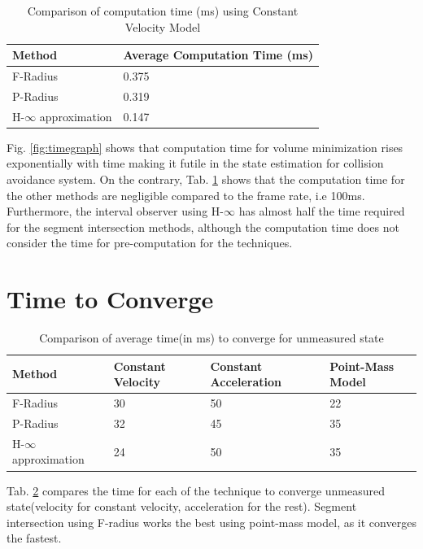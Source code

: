 \begin{table}[htbp]
\caption{Comparison of computation time (ms) using Constant Velocity Model\\}
	\centering
	\renewcommand{\arraystretch}{1.1}
	\small	
	\begin{tabular}{l l}
		\toprule 
		\textbf{Method} & \textbf{Average Computation Time (ms)}\\ \midrule
		F-Radius & 0.375\\
		P-Radius &0.319\\
		H-$\infty$ approximation & 0.147\\
		\bottomrule
	\end{tabular}
	\label{tab:comptime}
\end{table}
Fig. \ref{fig:timegraph} shows that computation time for volume minimization rises exponentially with time making it futile in the state estimation for collision avoidance system. On the contrary, Tab. \ref{tab:comptime} shows that the computation time for the other methods are negligible compared to the frame rate, i.e 100ms. Furthermore, the interval observer using H-$\infty$ has almost half the time required for the segment intersection methods, although the computation time does not consider the time for pre-computation for the techniques.



\section{Time to Converge}
\begin{table}[htbp]
\caption{Comparison of average time(in ms) to converge for unmeasured state\\}
	\centering
	\renewcommand{\arraystretch}{1.1}
	\small	
	\begin{tabular}{l l l l}
		\toprule 
		\textbf{Method} & \textbf{Constant Velocity} & \textbf{Constant Acceleration} & \textbf{Point-Mass Model} \\ \midrule
		F-Radius & 30 & 50 & 22\\
		P-Radius & 32 & 45 & 35\\
		H-$\infty$ approximation & 24 & 50 & 35\\
		\bottomrule
	\end{tabular}
	\label{tab:convtime}
\end{table}
Tab. \ref{tab:convtime} compares the time for each of the technique to converge unmeasured state(velocity for constant velocity, acceleration for the rest). Segment intersection using F-radius works the best using point-mass model, as it converges the fastest.


